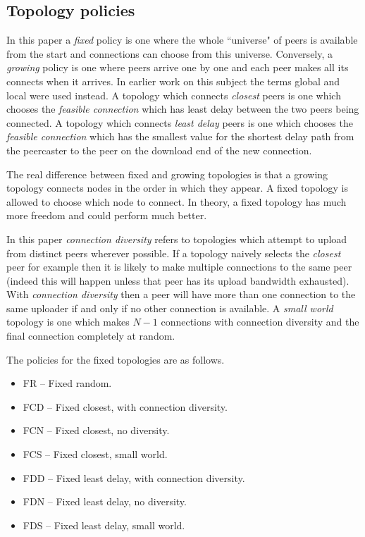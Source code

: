 \subsection{Topology policies}
\label{sec:toppolicy}

In this paper a {\em fixed\/} policy is one where the whole ``universe" of
peers is available from the start and connections can choose from this
universe.  Conversely, a {\em growing\/} policy is one where peers 
arrive one by one and each peer makes all its connects when it arrives.
In earlier work on this subject 
\cite{ukpew} 
the terms global and local were used instead.  
A topology which connects {\em closest\/} peers is one which chooses 
the {\em feasible connection\/} which has least delay between the two
peers being connected.  A topology which
connects {\em least delay\/} peers is one which chooses the
{\em feasible connection\/} which has the smallest value for the
shortest delay path from the peercaster to the peer on the download
end of the new connection.

\begin{remark}
The real difference between fixed and growing topologies is that a growing 
topology connects nodes in the order in which they appear.  A fixed topology
is allowed to choose which node to connect.  In theory, a fixed
topology has much more freedom and could perform much better.
\end{remark}

In this paper {\em connection diversity\/} refers to topologies which attempt to upload 
from distinct peers wherever possible.  If a topology naively selects the {\em closest\/}
peer for example then it is likely to make multiple connections to the same peer (indeed 
this will happen unless that peer has its upload bandwidth exhausted).  With {\em
connection diversity\/} then a peer will have more than one connection to the same uploader
if and only if no other connection is available.  A {\em small world\/} topology is one which 
makes $N-1$ connections with connection diversity and the final connection completely at random.

The policies for the fixed topologies are as follows.
\begin{itemize}
\item FR -- Fixed random.
\item FCD -- Fixed closest, with connection diversity.
\item FCN -- Fixed closest, no diversity.
\item FCS -- Fixed closest, small world.
\item FDD -- Fixed least delay, with connection diversity.
\item FDN -- Fixed least delay, no diversity.
\item FDS -- Fixed least delay, small world.
\end{itemize}

